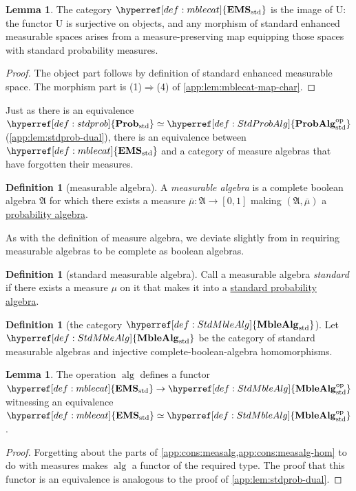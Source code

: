 \documentclass[
  sigconf,
  screen, ]{acmart}
\theoremstyle{definition}
\newtheorem{lemma}[theorem]{Lemma}
\newtheorem{definition}[theorem]{Definition}
\newcommand\frakA{\mathfrak A}
\newcommand\fremlinft[3]{\citet[\href{https://www1.essex.ac.uk/maths/people/fremlin/chap#2.pdf\#page=#3}{#1}]{fremlin2000measure}}
\newcommand\nref[2]{\hyperref[#1]{#2}} \newcommand\checkhigh{{\huge{\color{red}\textbf{TODO: check}}}}
\newcommand\op{^{\rm op}}
\newcommand\measalg{\operatorname{\nref{app:cons:measalg}{alg}}}
\newcommand\texforgetmu{\mathrm{U}}
\newcommand\forgetmu{{\nref{def:forgetmu}{\texforgetmu}}}
\newcommand\texStdProb{\mathbf{Prob}_{\rm std}}
\newcommand\StdProb{{\nref{def:stdprob}{\texStdProb}}}
\newcommand\StdProbAlgop{\nref{def:StdProbAlg}{\mathbf{ProbAlg}_{\rm std}\op}}
\newcommand\texStdMble{\mathbf{EMS}_{\rm std}}
\newcommand\StdMble{{\nref{def:mblecat}{\texStdMble}}}
\newcommand\StdMbleAlg{{\nref{def:StdMbleAlg}{\mathbf{MbleAlg}_{\rm std}}}}
\newcommand\StdMbleAlgop{{\nref{def:StdMbleAlg}{\mathbf{MbleAlg}_{\rm std}\op}}}
\begin{document}
\begin{lemma} \label{app:lem:stdmble-img}
  The category $\StdMble$ is the image of $\forgetmu$:
  the functor $\forgetmu$ is surjective on objects,
  and any morphism of standard enhanced measurable spaces
  arises from a measure-preserving map equipping
  those spaces with standard probability measures.
\end{lemma}
\begin{proof}
  The object part follows by definition of standard enhanced measurable space.
  The morphism part is (1)$\Rightarrow$(4) of \cref{app:lem:mblecat-map-char}.
\end{proof}

Just as there is an equivalence $\StdProb\simeq\StdProbAlgop$ (\cref{app:lem:stdprob-dual}),
there is an equivalence between $\StdMble$
and a category of measure algebras that have forgotten their measures.

\begin{definition}[measurable algebra] \label{app:def:measurable-alg}
  A \emph{measurable algebra} is a complete boolean algebra $\frakA$
  for which there exists a measure $\overline\mu : \frakA\to[0,1]$
  making $(\frakA,\overline\mu)$ a \nref{app:def:measalg}{probability algebra}.
\end{definition}

As with the definition of measure algebra, we deviate slightly from
\fremlinft{391B(a)}{39}{2} in requiring measurable algebras to be
complete as boolean algebras.

\begin{definition}[standard measurable algebra] \label{app:def:stdmblealg-def}
  Call a measurable algebra \emph{standard}
  if there exists a measure $\mu$ on it
  that makes it into a \nref{app:def:stdprobalg-def}{standard probability algebra}.
\end{definition}

\begin{definition}[the category $\StdMbleAlg$] \label{app:def:stdmblealg}
  Let $\StdMbleAlg$ be the category of standard measurable algebras
  and injective complete-boolean-algebra homomorphisms.
\end{definition}

\begin{lemma} \label{app:lem:mblecat-dual}
  The operation $\measalg$
  defines a functor $\StdMble\to\StdMbleAlgop$
  witnessing an equivalence
  $\StdMble\simeq\StdMbleAlgop$.
\end{lemma}
\begin{proof}
  Forgetting about the parts of
  \cref{app:cons:measalg,app:cons:measalg-hom}
  to do with measures makes $\measalg$
  a functor of the required type.
  The proof that this functor is an equivalence
  is analogous to the proof of \cref{app:lem:stdprob-dual}.
\end{proof}
\end{document}
